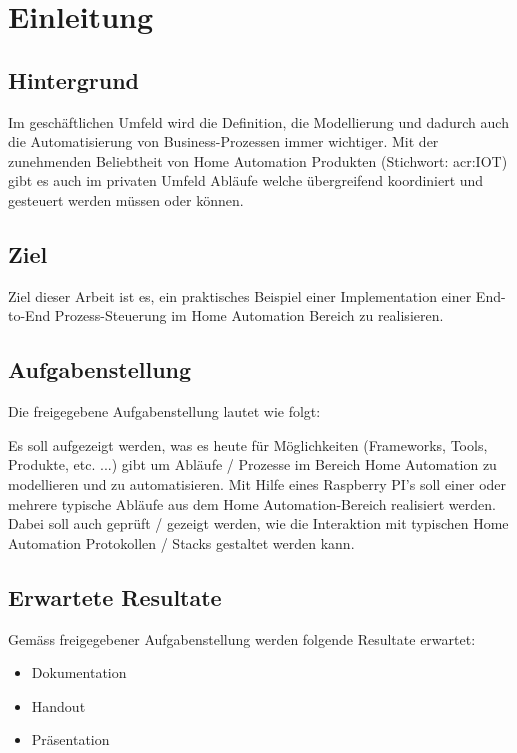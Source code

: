 
\chapter{Einleitung}

\section{Hintergrund}
Im geschäftlichen Umfeld wird die Definition, die Modellierung und dadurch auch die Automatisierung von Business-Prozessen immer wichtiger. Mit der zunehmenden Beliebtheit von Home Automation Produkten (Stichwort: \gls{acr:IOT}) gibt es auch im privaten Umfeld Abläufe welche übergreifend koordiniert und gesteuert werden müssen oder können.

\section{Ziel}
Ziel dieser Arbeit ist es, ein praktisches Beispiel einer Implementation einer
End-to-End Prozess-Steuerung im Home Automation Bereich zu realisieren.

\section{Aufgabenstellung} \label{sec:Aufgabenstellung}
Die freigegebene Aufgabenstellung lautet wie folgt:

Es soll aufgezeigt werden, was es heute für Möglichkeiten (Frameworks, Tools,
Produkte, etc. ...) gibt um Abläufe / Prozesse im Bereich Home Automation zu
modellieren und zu automatisieren. Mit Hilfe eines Raspberry PI's soll einer oder
mehrere typische Abläufe aus dem Home Automation-Bereich realisiert werden.
Dabei soll auch geprüft / gezeigt werden, wie die Interaktion mit typischen
Home Automation Protokollen / Stacks gestaltet werden kann.

\newpage
\section{Erwartete Resultate} \label{sec:ErwarteteResultate}
Gemäss freigegebener Aufgabenstellung werden folgende Resultate erwartet:

\begin{itemize}
\item Dokumentation
\item Handout
\item Präsentation
\end{itemize}


